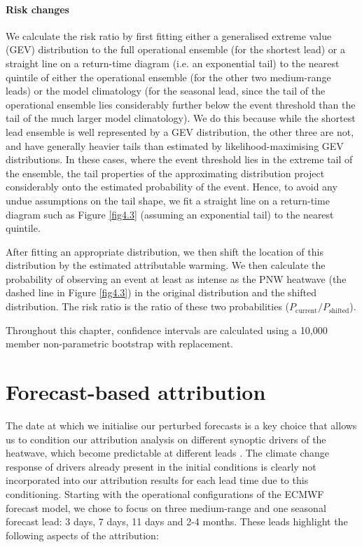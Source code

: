    \paragraph*{Risk changes}
  
      We calculate the risk ratio by first fitting either a generalised extreme value (GEV) distribution to the full operational ensemble (for the shortest lead) or a straight line on a return-time diagram (i.e. an exponential tail) to the nearest quintile of either the operational ensemble (for the other two medium-range leads) or the model climatology (for the seasonal lead, since the tail of the operational ensemble lies considerably further below the event threshold than the tail of the much larger model climatology). We do this because while the shortest lead ensemble is well represented by a GEV distribution, the other three are not, and have generally heavier tails than estimated by likelihood-maximising GEV distributions. In these cases, where the event threshold lies in the extreme tail of the ensemble, the tail properties of the approximating distribution project considerably onto the estimated probability of the event. Hence, to avoid any undue assumptions on the tail shape, we fit a straight line on a return-time diagram such as Figure \ref{fig4.3} (assuming an exponential tail) to the nearest quintile. 
  
      After fitting an appropriate distribution, we then shift the location of this distribution by the estimated attributable warming. We then calculate the probability of observing an event at least as intense as the PNW heatwave (the dashed line in Figure \ref{fig4.3}) in the original distribution and the shifted distribution. The risk ratio is the ratio of these two probabilities ($P_\text{current} / P_\text{shifted}$).
  
      Throughout this chapter, confidence intervals are calculated using a 10,000 member non-parametric bootstrap with replacement.

\section{Forecast-based attribution}

  The date at which we initialise our perturbed forecasts is a key choice that allows us to condition our attribution analysis on different synoptic drivers of the heatwave, which become predictable at different leads \cite{lin_2021_2022,mo_anomalous_2022}. The climate change response of drivers already present in the initial conditions is clearly not incorporated into our attribution results for each lead time due to this conditioning. Starting with the operational configurations of the ECMWF forecast model, we chose to focus on three medium-range and one seasonal forecast lead: 3 days, 7 days, 11 days and 2-4 months. These leads highlight the following aspects of the attribution: 

